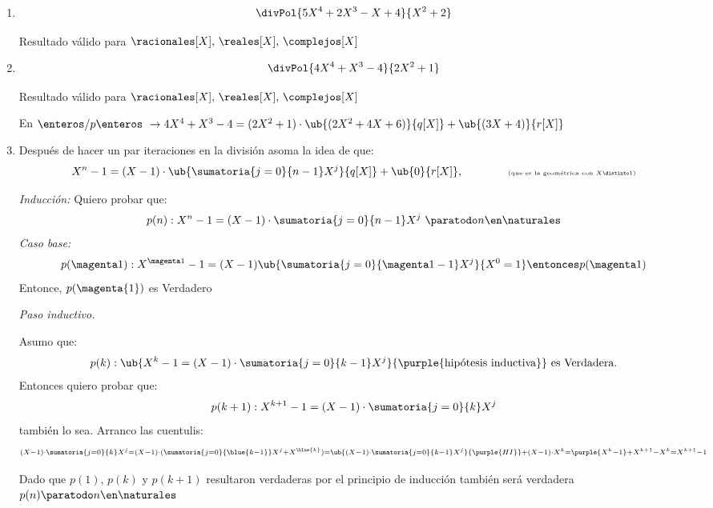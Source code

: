 \begin{enumerate}[label=\roman*)]
  \item $$
          \divPol{5X^4 + 2X^3 - X + 4}{X^2 + 2}
        $$

        Resultado válido para $\racionales[X],\,\reales[X],\,\complejos[X]$

  \item $$
          \divPol{4X^4 + X^3 - 4}{2X^2 + 1}
        $$

        Resultado válido para $\racionales[X],\,\reales[X],\,\complejos[X]$

        En $\enteros/p\enteros\
          \to
          4X^4 + X^3 -4 = (2X^2 + 1) \cdot \ub{(2X^2 + 4X + 6)}{q[X]} + \ub{(3X + 4)}{r[X]}$

  \item Después de hacer un par iteraciones en la división asoma la idea de que:
        $$
          X^n - 1 = (X-1) \cdot \ub{\sumatoria{j=0}{n-1} X^j}{q[X]} + \ub{0}{r[X]},
          \qquad\qquad{\text{\tiny(que es la geométrica con $X \distinto 1$)}}
        $$

        \textit{Inducción: } Quiero probar que:
        $$
          p(n): X^n - 1 = (X-1) \cdot \sumatoria{j=0}{n-1} X^j  \ \paratodo n \en \naturales
        $$
        \textit{Caso base: }
        $$
          p(\magenta1):
          X^{\magenta1} - 1 = (X - 1) \ub{\sumatoria{j=0}{\magenta1 - 1} X^j}{X^0 = 1}
          \entonces
          p(\magenta1)
        $$
        Entonce, $p(\magenta{1})$ es Verdadero

        \textit{Paso inductivo.}

        Asumo que:
        $$
          p(k) : \ub{X^k - 1 = (X-1) \cdot \sumatoria{j=0}{k-1}X^j}{\purple{\text{hipótesis inductiva}}} \text{ es Verdadera}.
        $$
        Entonces quiero probar que:
        $$
          p(k+1): X^{k+1} - 1 = (X-1) \cdot \sumatoria{j=0}{k}X^j
        $$
        también lo sea. Arranco las cuentulis:
        $$
          \scriptstyle
          (X-1) \cdot \sumatoria{j=0}{k} X^j =
          (X-1) \cdot (\sumatoria{j=0}{\blue{k-1}} X^j + X^{\blue{k}} ) =
          \ub{\scriptstyle (X-1) \cdot \sumatoria{j=0}{k-1} X^j }{\purple{HI}} + (X - 1) \cdot X^k =
          \purple{X^k - 1} + X^{k+1} - X^k = X^{k+1} - 1
        $$

        Dado que $p(1),\, p(k) $ y $p(k+1)$ resultaron verdaderas por el principio de inducción también
        será verdadera $p(n) \paratodo n \en \naturales$

\end{enumerate}

\begin{aportes}
  \item {}
\end{aportes}
